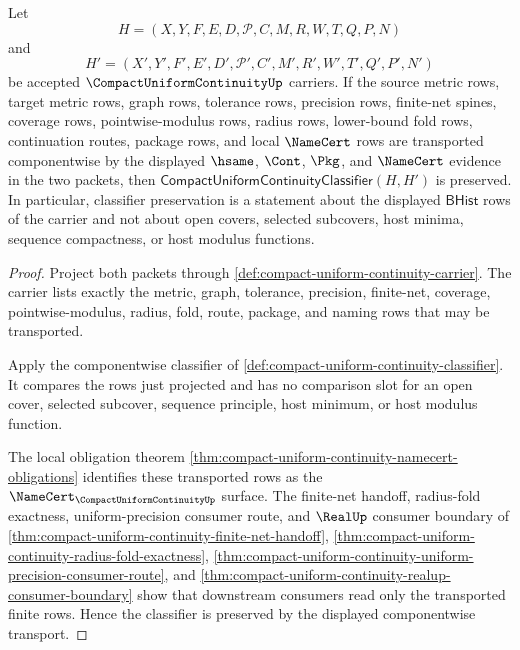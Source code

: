 \begin{theorem}
\label{thm:compact-uniform-continuity-classifier-transport}
Let
$$
H=(X,Y,F,E,D,\mathcal{P},C,M,R,W,T,Q,P,N)
$$
and
$$
H'=(X',Y',F',E',D',\mathcal{P}',C',M',R',W',T',Q',P',N')
$$
be accepted $\CompactUniformContinuityUp$ carriers. If the source metric rows, target metric rows, graph rows, tolerance rows, precision rows, finite-net spines, coverage rows, pointwise-modulus rows, radius rows, lower-bound fold rows, continuation routes, package rows, and local $\NameCert$ rows are transported componentwise by the displayed $\hsame$, $\Cont$, $\Pkg$, and $\NameCert$ evidence in the two packets, then $\mathsf{CompactUniformContinuityClassifier}(H,H')$ is preserved. In particular, classifier preservation is a statement about the displayed $\mathsf{BHist}$ rows of the carrier and not about open covers, selected subcovers, host minima, sequence compactness, or host modulus functions.
\end{theorem}
\begin{proof}
Project both packets through \autoref{def:compact-uniform-continuity-carrier}. The carrier lists exactly the metric, graph, tolerance, precision, finite-net, coverage, pointwise-modulus, radius, fold, route, package, and naming rows that may be transported.

Apply the componentwise classifier of \autoref{def:compact-uniform-continuity-classifier}. It compares the rows just projected and has no comparison slot for an open cover, selected subcover, sequence principle, host minimum, or host modulus function.

The local obligation theorem \autoref{thm:compact-uniform-continuity-namecert-obligations} identifies these transported rows as the $\NameCert_{\CompactUniformContinuityUp}$ surface. The finite-net handoff, radius-fold exactness, uniform-precision consumer route, and $\RealUp$ consumer boundary of \autoref{thm:compact-uniform-continuity-finite-net-handoff}, \autoref{thm:compact-uniform-continuity-radius-fold-exactness}, \autoref{thm:compact-uniform-continuity-uniform-precision-consumer-route}, and \autoref{thm:compact-uniform-continuity-realup-consumer-boundary} show that downstream consumers read only the transported finite rows. Hence the classifier is preserved by the displayed componentwise transport.
\end{proof}

